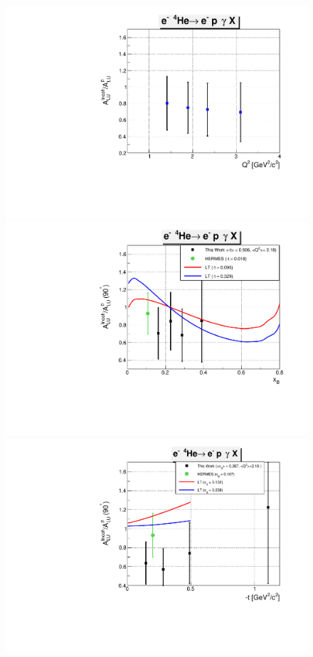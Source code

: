 \begin{figure}[tp]
\centering
\includegraphics[scale=0.38]{fig_updated/BSA_ratio_incoh_Q2.pdf}\\
\includegraphics[scale=0.38]{fig_updated/BSA_ratio_incoh_xB.pdf}\\
\includegraphics[scale=0.38]{fig_updated/BSA_ratio_incoh_t.pdf}

\end{figure}

